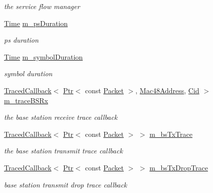 \begin{DoxyCompactItemize}
\begin{DoxyCompactList}\small\item\em the service flow manager \end{DoxyCompactList}\item 
\hyperlink{classns3_1_1Time}{Time} \hyperlink{classns3_1_1BaseStationNetDevice_a83cef590dfbd575c22566f6d6d24d307}{m\+\_\+ps\+Duration}
\begin{DoxyCompactList}\small\item\em ps duration \end{DoxyCompactList}\item 
\hyperlink{classns3_1_1Time}{Time} \hyperlink{classns3_1_1BaseStationNetDevice_aa05b0ce117a76f70b9c4062d9d687e57}{m\+\_\+symbol\+Duration}
\begin{DoxyCompactList}\small\item\em symbol duration \end{DoxyCompactList}\item 
\hyperlink{classns3_1_1TracedCallback}{Traced\+Callback}$<$ \hyperlink{classns3_1_1Ptr}{Ptr}$<$ const \hyperlink{classns3_1_1Packet}{Packet} $>$, \hyperlink{classns3_1_1Mac48Address}{Mac48\+Address}, \hyperlink{classns3_1_1Cid}{Cid} $>$ \hyperlink{classns3_1_1BaseStationNetDevice_a0eb479748371aa4a19d45a57434020b8}{m\+\_\+trace\+B\+S\+Rx}
\begin{DoxyCompactList}\small\item\em the base station receive trace callback \end{DoxyCompactList}\item 
\hyperlink{classns3_1_1TracedCallback}{Traced\+Callback}$<$ \hyperlink{classns3_1_1Ptr}{Ptr}$<$ const \hyperlink{classns3_1_1Packet}{Packet} $>$ $>$ \hyperlink{classns3_1_1BaseStationNetDevice_af52f29795598ce94f2932d351230b251}{m\+\_\+bs\+Tx\+Trace}
\begin{DoxyCompactList}\small\item\em the base station transmit trace callback \end{DoxyCompactList}\item 
\hyperlink{classns3_1_1TracedCallback}{Traced\+Callback}$<$ \hyperlink{classns3_1_1Ptr}{Ptr}$<$ const \hyperlink{classns3_1_1Packet}{Packet} $>$ $>$ \hyperlink{classns3_1_1BaseStationNetDevice_a476cd66e863b2439f5a007a02805a7dc}{m\+\_\+bs\+Tx\+Drop\+Trace}
\begin{DoxyCompactList}\small\item\em base station transmit drop trace callback \end{DoxyCompactList}\item 

\end{DoxyCompactItemize}
